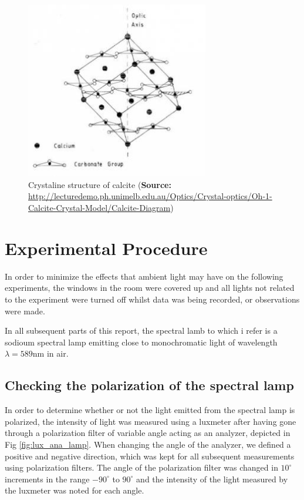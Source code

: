\documentclass[11pt,a4paper, twocolumn]{article}
\begin{document}
    \begin{figure}[H]
      \center
      \includegraphics[width=8cm]{scripts/figs/calcite.jpg}
      \caption{Crystaline structure of calcite (\textbf{Source:} \url{http://lecturedemo.ph.unimelb.edu.au/Optics/Crystal-optics/Oh-1-Calcite-Crystal-Model/Calcite-Diagram})}
      \label{fig:calcite}
    \end{figure}

\section{\label{section:experimental}Experimental Procedure} 
  
  In order to minimize the effects that ambient light may have on the following experiments, the windows in the room were covered up and all lights not related to the experiment were turned off whilst data was being recorded, or observations were made.

  In all subsequent parts of this report, the spectral lamb to which i refer is a sodioum spectral lamp emitting close to monochromatic light of wavelength $\lambda=589$nm in air.

  \subsection{\label{subsect:polar_lamp}Checking the polarization of the spectral lamp}
    In order to determine whether or not the light emitted from the spectral lamp is polarized, the intensity of light was measured using a luxmeter\cite{data:luxmeter} after having gone through a polarization filter of variable angle acting as an analyzer, depicted in Fig \ref{fig:lux_ana_lamp}. When changing the angle of the analyzer, we defined a positive and negative direction, which was kept for all subsequent measurements using polarization filters. The angle of the polarization filter was changed in $10^\circ$ increments in the range $-90^\circ$ to $90^\circ$ and the intensity of the light measured by the luxmeter was noted for each angle.
\end{document}
